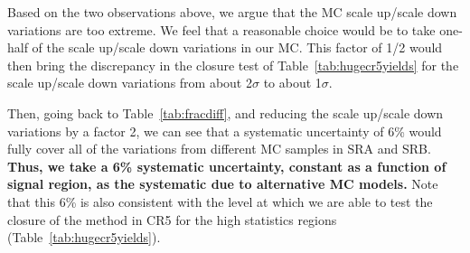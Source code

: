 

Based on the two observations above, we argue that the MC 
scale up/scale down variations are too extreme.  We feel that
a reasonable choice would be to take one-half of the scale up/scale
down variations in our MC.  This factor of 1/2 would then bring 
the discrepancy in the closure test of 
Table~\ref{tab:hugecr5yields} for the scale up/scale down variations
from about 2$\sigma$ to about 1$\sigma$.

Then, going back to Table~\ref{tab:fracdiff}, and reducing the scale
up/scale
down variations by a factor 2, we can see that a systematic
uncertainty
of 6\% would fully cover all of the variations from different MC
samples in SRA and SRB.
{\bf Thus, we take a 6\% systematic uncertainty,  constant as a 
function of signal region, as the systematic due to alternative MC
models.}
Note that this 6\% is also consistent with the level at which we are
able
to test the closure of the method in CR5 for the high statistics
regions 
(Table~\ref{tab:hugecr5yields}).










